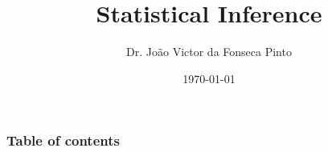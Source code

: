 \documentclass{beamer}
\begin{document}
\title{Statistical Inference}  
\author{Dr. João Victor da Fonseca Pinto}
\date{\today} 

\begin{frame}
\titlepage
\end{frame}

\begin{frame}
    \frametitle{Table of contents}
    \tableofcontents
\end{frame} 


\end{document}
